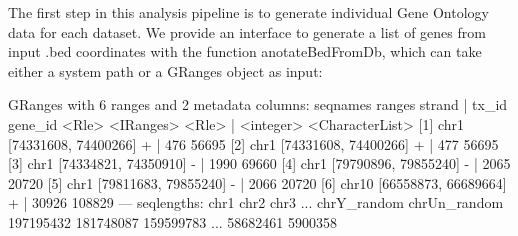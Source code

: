 \documentclass[11pt, oneside]{article}
\begin{document}
The first step in this analysis pipeline is to generate individual Gene Ontology data for each dataset. We provide an interface to generate a list of genes from input .bed coordinates with the function anotateBedFromDb, which can take either a system path or a GRanges object as input:
\begin{Schunk}
\begin{Soutput}
GRanges with 6 ranges and 2 metadata columns:
      seqnames               ranges strand |     tx_id         gene_id
         <Rle>            <IRanges>  <Rle> | <integer> <CharacterList>
  [1]     chr1 [74331608, 74400266]      + |       476           56695
  [2]     chr1 [74331608, 74400266]      + |       477           56695
  [3]     chr1 [74334821, 74350910]      - |      1990           69660
  [4]     chr1 [79790896, 79855240]      - |      2065           20720
  [5]     chr1 [79811683, 79855240]      - |      2066           20720
  [6]    chr10 [66558873, 66689664]      + |     30926          108829
  ---
  seqlengths:
           chr1         chr2         chr3 ...  chrY_random chrUn_random
      197195432    181748087    159599783 ...     58682461      5900358
\end{Soutput}
\end{Schunk}
\end{document}
